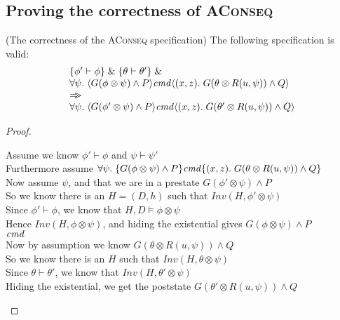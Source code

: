 \subsection{Proving the correctness of \textsc{AConseq}}



\begin{prop*}{(The correctness of the \textsc{AConseq} specification)}
The following specification is valid:
\begin{displaymath}
\begin{array}{l}
\{{\phi' \vdash \phi}\} \;\&\; \{{\theta \vdash \theta'}\} \;\&\; \\
\forall \psi.\; \langle{G(\phi \otimes \psi) \land P}\rangle{\mathit{cmd}}\langle{(x,z)}.\;{G(\theta\otimes R(u, \psi)) \land Q}\rangle \\
\Rightarrow\!\!\!> \\
\forall \psi.\; \langle{G(\phi' \otimes \psi) \land P}\rangle{\mathit{cmd}}\langle{(x,z)}.\;{G(\theta'\otimes R(u, \psi)) \land Q}\rangle  \\
\end{array}
\end{displaymath}
\end{prop*}

\begin{proof}
\begin{tabbedproof}
\oo Assume we know $\phi' \vdash \phi$ and $\psi \vdash \psi'$ \\
\oo Furthermore assume $\forall \psi.\; \{{G(\phi \otimes \psi) \land P}\}{\mathit{cmd}}\{{(x,z)}.\;{G(\theta\otimes R(u, \psi)) \land Q}\}$ \\
\ooo Now assume $\psi$, and that we are in a prestate $G(\phi' \otimes \psi) \land P$ \\
\ooo So we know there is an $H = (D,h)$ such that $\mathit{Inv}(H, \phi' \otimes \psi)$ \\
\ooo Since $\phi' \vdash \phi$, we know that $H, D \models \phi \otimes \psi$ \\
\ooo Hence $\mathit{Inv}(H, \phi \otimes \psi)$, and hiding the existential gives $G(\phi \otimes \psi) \land P$ \\
\ooo $\mathit{cmd}$ \\
\ooo Now by assumption we know $G(\theta \otimes R(u, \psi)) \land Q$ \\
\ooo So we know there is an $H$ such that $\mathit{Inv}(H, \theta \otimes \psi)$ \\
\ooo Since $\theta \vdash \theta'$, we know that $\mathit{Inv}(H, \theta' \otimes \psi)$ \\
\ooo Hiding the existential, we get the poststate $G(\theta'\otimes R(u, \psi)) \land Q$ \\
\end{tabbedproof}
\end{proof}

